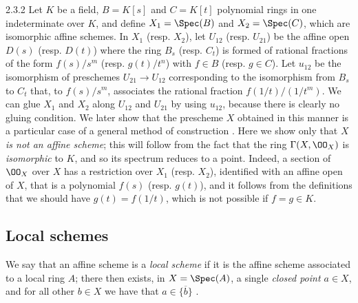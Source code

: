 \begin{env}[Example]{2.3.2}
\label{1.2.3.2}
Let $K$ be a field, $B=K[s]$ and $C=K[t]$ polynomial rings in one indeterminate over $K$, and define $X_1=\Spec(B)$ and $X_2=\Spec(C)$, which are isomorphic affine schemes.
In $X_1$ (resp. $X_2$), let $U_{12}$ (resp. $U_{21}$) be the affine open $D(s)$ (resp. $D(t)$) where the ring $B_s$ (resp. $C_t$) is formed of rational fractions of the form $f(s)/s^m$ (resp. $g(t)/t^n$) with $f\in B$ (resp. $g\in C$).
Let $u_{12}$ be the isomorphism of preschemes $U_{21}\to U_{12}$ corresponding  to the isomorphism from $B_s$ to $C_t$ that, to $f(s)/s^m$, associates the rational fraction $f(1/t)/(1/t^m)$.
We can glue $X_1$ and $X_2$ along $U_{12}$ and $U_{21}$ by using $u_{12}$, because there is clearly no gluing condition.
We later show that the prescheme $X$ obtained in this manner is a particular case of a general method of construction .
Here we show only that $X$ \emph{is not an affine scheme};
this will follow from the fact that the ring $\Gamma(X,\OO_X)$ is \emph{isomorphic} to $K$, and so its spectrum reduces to a point.
Indeed, a section of $\OO_X$ over $X$ has a restriction over $X_1$ (resp. $X_2$), identified with an affine open of $X$, that is a polynomial $f(s)$ (resp. $g(t)$), and it follows from the definitions that we should have $g(t)=f(1/t)$, which is not possible if $f=g\in K$.
\end{env}

\subsection{Local schemes}
\label{subsection:local-schemes}

\begin{env}[2.4.1]
\label{1.2.4.1}
We say that an affine scheme is a \emph{local scheme} if it is the affine scheme associated to a local ring $A$;
there then exists, in $X=\Spec(A)$, a single \emph{closed point $a\in X$}, and for all other $b\in X$ we have that $a\in\overline{\{b\}}$ .
\end{env}

